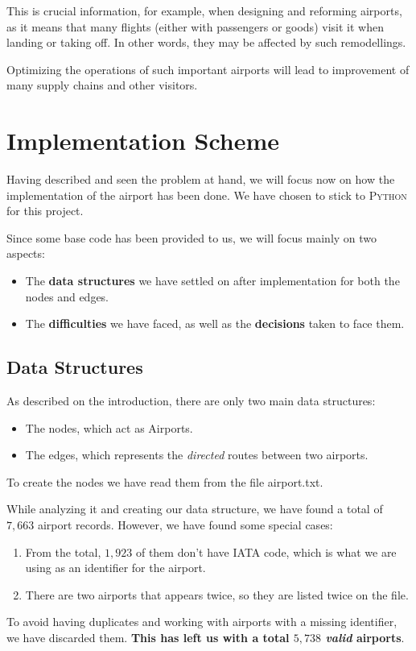 \documentclass[10pt, a4paper]{article}
\begin{document}
This is crucial information, for example, when designing and reforming airports, as it means that many flights (either with passengers or goods) visit it when landing or taking off. In other words, they may be affected by such remodellings. 

Optimizing the operations of such important airports will lead to improvement of many supply chains and other visitors.

\section{Implementation Scheme}
Having described and seen the problem at hand, we will focus now on how the implementation of the airport has been done. We have chosen to stick to \textsc{Python} for this project.

Since some base code has been provided to us, we will focus mainly on two aspects:
\begin{itemize}
    \item The \textbf{data structures} we have settled on after implementation for both the nodes and edges.
    \item The \textbf{difficulties} we have faced, as well as the \textbf{decisions} taken to face them.
\end{itemize}

\subsection{Data Structures}
As described on the introduction, there are only two main data structures:
\begin{itemize}
    \item The nodes, which act as Airports.
    \item The edges, which represents the \textit{directed} routes between two airports.
\end{itemize}
To create the nodes we have read them from the file {\selectfont airport.txt}.

\noindent While analyzing it and creating our data structure, we have found a total of $7,663$ airport records. However, we have found some special cases:
\begin{enumerate}
    \item From the total, $1,923$ of them don't have IATA code, which is what we are using as an identifier for the airport.
    \item There are two airports that appears twice, so they are listed twice on the file.
\end{enumerate}
To avoid having duplicates and working with airports with a missing identifier, we have discarded them. \textbf{This has left us  with a total $5,738$ \textit{valid} airports}. 
\end{document}
